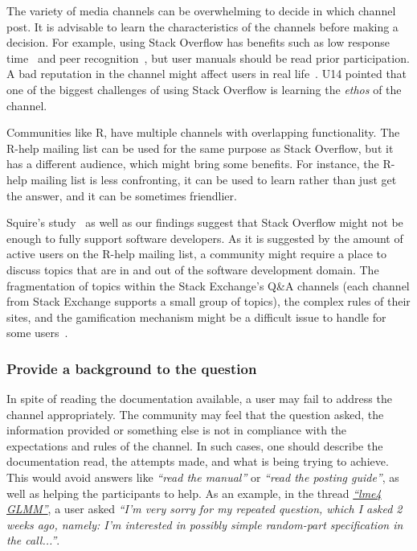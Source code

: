     The variety of media channels can be overwhelming to decide in which channel post.
    It is advisable to learn the characteristics of the channels before making a decision.
    For example, using Stack Overflow has benefits such as low response time~\cite{Mamykina2011} and peer recognition~\cite{Singer2013}, but user manuals should be read prior participation.
    A bad reputation in the channel might affect users in real life~\cite{Singer2013}.
    U14 pointed that one of the biggest challenges of using Stack Overflow is learning the \emph{ethos} of the channel.
    
    Communities like R, have multiple channels with overlapping functionality.
    The R-help mailing list can be used for the same purpose as Stack Overflow, but it has a different audience, which might bring some benefits.
    For instance, the R-help mailing list is less confronting, it can be used to learn rather than just get the answer, and it can be sometimes friendlier.
    
    Squire's study~\cite{Squire2015a} as well as our findings suggest that Stack Overflow might not be enough to fully support software developers.
    As it is suggested by the amount of active users on the R-help mailing list, a community might require a place to discuss topics that are in and out of the software development domain.
    The fragmentation of topics within the Stack Exchange's Q\&A channels (each channel from Stack Exchange supports a small group of topics), the complex rules of their sites, and the gamification mechanism might be a difficult issue to handle for some users~\cite{Vasilescu2013}.

\subsubsection{Provide a background to the question}

    In spite of reading the documentation available, a user may fail to address the channel appropriately.
    The community may feel that the question asked, the information provided or something else is not in compliance with the expectations and rules of the channel.
    In such cases, one should describe the documentation read, the attempts made, and what is being trying to achieve.
    This would avoid answers like \textit{``read the manual''} or \textit{``read the posting guide''}, as well as helping the participants to help.
    As an example, in the thread \textit{\href{https://goo.gl/Gbek3R}{``lme4 GLMM''}}, a user asked \textit{``I'm very sorry for my repeated question, which I asked 2 weeks ago, namely: I'm interested in possibly simple random-part specification in the call...''}.


